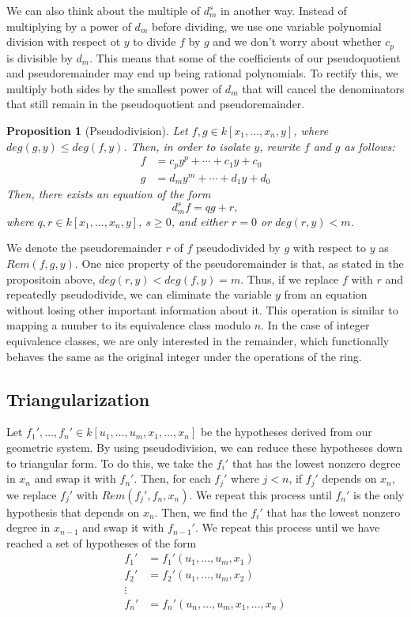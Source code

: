 \documentclass[12pt]{article}
\theoremstyle{plain}
\newtheorem{Proposition}[Theorem]{Proposition}
\theoremstyle{definition}
\theoremstyle{remark}
\begin{document}
We can also think about the multiple of $d_m^s$ in another way. 
Instead of multiplying by a power of $d_m$ before dividing, we use one variable polynomial division with respect ot $y$ to divide $f$ by $g$ and we don't worry about whether $c_p$ is divisible by $d_m$. 
This means that some of the coefficients of our pseudoquotient and pseudoremainder may end up being rational polynomials. 
To rectify this, we multiply both sides by the smallest power of $d_m$ that will cancel the denominators that still remain in the pseudoquotient and pseudoremainder.
\begin{Proposition}[Pseudodivision]
Let $f, g \in k[x_1,\dots,x_n,y]$, where $deg(g,y) \leq deg(f,y)$. Then, in order to isolate $y$, rewrite $f$ and $g$ as follows:
\begin {align*}
    f & = c_py^p + \cdots + c_1y + c_0\\
    g & = d_my^m + \cdots + d_1y + d_0
\end{align*}
Then, there exists an equation of the form $$d_m^s f = qg + r,$$ where $q,r \in k[x_1,\dots,x_n,y]$, $s \geq 0$, and either $r = 0$ or $deg(r,y) < m$.
\end{Proposition}

We denote the pseudoremainder $r$ of $f$ pseudodivided by $g$ with respect to $y$ as $Rem(f,g,y)$.
One nice property of the pseudoremainder is that, as stated in the propositoin above, $deg(r,y) < deg(f,y) = m$. 
Thus, if we replace $f$ with $r$ and repeatedly pseudodivide, we can eliminate the variable $y$ from an equation without losing other important information about it. 
This operation is similar to mapping a number to its equivalence class modulo $n$. 
In the case of integer equivalence classes, we are only interested in the remainder, which functionally behaves the same as the original integer under the operations of the ring.

\subsection{Triangularization}
Let $f_1',\dots,f_n' \in k[u_1,\dots,u_m,x_1,\dots,x_n]$ be the hypotheses derived from our geometric system.
By using pseudodivision, we can reduce these hypotheses down to triangular form. To do this, we take the $f_i'$ that has the lowest nonzero degree in $x_n$ and swap it with $f_n'$.
Then, for each $f_j'$ where $j < n$, if $f_j'$ depends on $x_n$, we replace $f_j'$ with $Rem(f_j', f_n, x_n)$. We repeat this process until $f_n'$ is the only hypothesis that depends on $x_n$. 
Then, we find the $f_i'$ that has the lowest nonzero degree in $x_{n-1}$ and swap it with $f_{n-1}'$.
We repeat this process until we have reached a set of hypotheses of the form
\begin{align*}
    f_1' & = f_1'(u_1,\dots,u_m,x_1)\\
    f_2' & = f_2'(u_1,\dots,u_m,x_2)\\
    \vdots & \\
    f_n' & = f_n'(u_n,\dots,u_m,x_1,\dots,x_n)
\end{align*}
\end{document}
